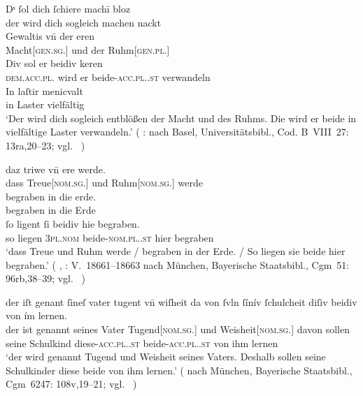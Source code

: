 \begin{exe}
\ex \label{ex:beid2p2combrem}
	\begin{xlist}
	\ex \label{ex:beid2p2combrem_1}
		\gll Dˢ ſol dich ſchiere machī bloz \\
			der wird dich sogleich machen nackt \\
	\sn \gll Gewaltis vn̄ der eren \\
			Macht[\textsc{gen.sg.\FemI}] und der Ruhm[\textsc{gen.pl.\FemI}] \\
	\sn \gll Div sol er beidiv keren \\
			\textsc{dem.acc.pl.\NeutI} wird er beide-\textsc{acc.pl.\NeutI.st}
			verwandeln \\
	\sn \gll In laſtir menicvalt \\
			in Laster vielfältig \\
		\trans `Der wird dich sogleich entblößen der Macht und des Ruhms.
			Die wird er beide in vielfältige Laster verwandeln.'
			(%
				: 
				nach Basel, Universitätsbibl., Cod. B~VIII~27: 13ra,20--23;
				vgl.~\cites[M317]{rem}%
			)

	\ex \label{ex:beid2p2combrem_2}
		\gll daz triwe vn̄ ere werde. \\
			dass Treue[\textsc{nom.sg.\FemI}] und Ruhm[\textsc{nom.sg.\FemI}] werde \\
	\sn \gll begraben in die erde. \\
			begraben in die Erde \\
	\sn \gll ſo ligent ſi beidiv hie begraben. \\
			so liegen \textsc{3pl\subI.nom} beide-\textsc{nom.pl.\NeutI.st} hier
			begraben \\
		\trans `dass Treue und Ruhm werde / begraben in der Erde. / So
			liegen sie beide hier begraben.'
			(%
				, :
				V.~18661--18663 nach
				München, Bayerische Staatsbibl., Cgm~51: 96rb,38--39;
				vgl.~\cites[259]{maroldschroeder1969}[M342]{rem}%
			)

	\ex \label{ex:beid2p2combrem_3}
		\gll der iſt genant ſineſ vater tugent vn̄ wiſheit
			{da von} ſvln ſínív ſchulcheit\upshape\footnotemark{} diſiv
			beidiv von ím lernen. \\
			der ist genannt seines Vater Tugend[\textsc{nom.sg.\FemI}] und
			Weisheit[\textsc{nom.sg.\FemI}] davon sollen seine Schulkind
			diese-\textsc{acc.pl.\NeutI.st} beide-\textsc{acc.pl.\NeutI.st} von ihm
			lernen \\
		\trans `der wird genannt Tugend und Weisheit seines Vaters.
			Deshalb sollen seine Schulkinder diese beide von ihm lernen.'
			(%
				 nach
				München, Bayerische Staatsbibl., Cgm~6247: 108v,19--21;
				vgl.~\cite[M401]{rem}%
			)
	\end{xlist}
\end{exe}

